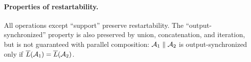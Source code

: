 \begin{figure*}[h]

\label{dt:fig:iteration}
\end{figure*}

\paragraph*{Properties of restartability.}
All operations except ``support'' preserve restartability.
The ``output-synchronized'' property is also preserved by union, concatenation, and iteration, but is not guaranteed with parallel composition: $\mathcal{A}_1 \; \| \; \mathcal{A}_2$ is output-synchronized only if $\overline{L}(\mathcal{A}_1) = \overline{L}(\mathcal{A}_2)$.

